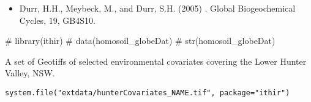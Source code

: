 \documentclass[a4paper]{book}
\begin{document}
%
\begin{References}
\begin{itemize}

\item{} Durr, H.H., Meybeck, M., and Durr, S.H. (2005) . Global Biogeochemical Cycles, 19, GB4S10. 

\end{itemize}

\end{References}
%
\begin{Examples}
\begin{ExampleCode}

# library(ithir)
# data(homosoil_globeDat)
# str(homosoil_globeDat)

\end{ExampleCode}
\end{Examples}
%
\begin{Description}
A set of Geotiffs of selected environmental covariates covering the Lower Hunter Valley, NSW.
\end{Description}
%
\begin{Usage}
\begin{verbatim}
system.file("extdata/hunterCovariates_NAME.tif", package="ithir")
\end{verbatim}
\end{Usage}
%
\end{document}
